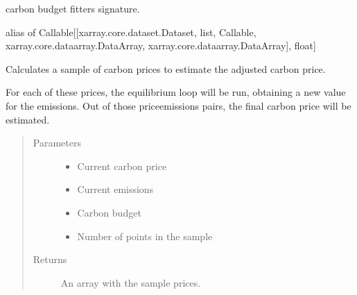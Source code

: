 \documentclass[letterpaper,10pt,english]{sphinxmanual}
\begin{document}
\begin{fulllineitems}
\label{\detokenize{api:muse.carbon_budget.CARBON_BUDGET_METHODS_SIGNATURE}}
carbon budget fitters signature.

alias of Callable{[}{[}xarray.core.dataset.Dataset, list, Callable, xarray.core.dataarray.DataArray, xarray.core.dataarray.DataArray{]}, float{]}

\end{fulllineitems}


\begin{fulllineitems}
\label{\detokenize{api:muse.carbon_budget.create_sample}}
Calculates a sample of carbon prices to estimate the adjusted carbon
price.

For each of these prices, the equilibrium loop will be run, obtaining a new value
for the emissions. Out of those price\sphinxhyphen{}emissions pairs, the final carbon price will
be estimated.
\begin{quote}\begin{description}
\item[{Parameters}] \leavevmode\begin{itemize}
\item {} 
 \textendash{} Current carbon price

\item {} 
 \textendash{} Current emissions

\item {} 
 \textendash{} Carbon budget

\item {} 
 \textendash{} Number of points in the sample

\end{itemize}

\item[{Returns}] \leavevmode
An array with the sample prices.

\end{description}\end{quote}

\end{fulllineitems}
\end{document}
